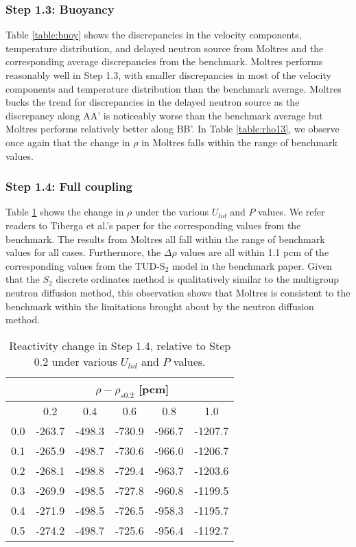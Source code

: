 \subsubsection{Step 1.3: Buoyancy}

Table \ref{table:buoy} shows the discrepancies in the velocity components,
temperature distribution, and delayed neutron source from Moltres and the
corresponding average discrepancies from the
benchmark. Moltres performs reasonably well in Step 1.3, with smaller
discrepancies in most of the velocity components and temperature distribution
than the benchmark average. Moltres bucks the trend for discrepancies
in the delayed neutron source as the discrepancy along AA' is
noticeably worse than the benchmark average but Moltres performs relatively
better along BB'. In Table \ref{table:rho13}, we observe once again that the
change in $\rho$ in Moltres falls within the range of benchmark values.

\subsubsection{Step 1.4: Full coupling}

Table \ref{table:full} shows the change in $\rho$ under the various $U_{lid}$
and $P$ values. We refer readers to Tiberga et al.'s paper
\cite{tiberga_results_2020} for the corresponding values from the benchmark.
The results from Moltres all fall within the range of benchmark values for all
cases. Furthermore, the $\Delta\rho$ values are all within 1.1 pcm of the
corresponding values from the TUD-S$_2$ model in the benchmark paper. Given
that the $S_2$ discrete ordinates method is qualitatively similar to the
multigroup neutron diffusion method, this observation shows that Moltres is
consistent to the benchmark within the limitations brought about by the neutron
diffusion method.

\begin{table}[htbp!]
	\caption{Reactivity change in Step 1.4, relative to Step 0.2 under various
	$U_{lid}$ and $P$ values.}
	\centering
	\small
	\setlength\tabcolsep{1.5pt}
	\begin{tabular}{c c c c c c}
		\toprule
		& \multicolumn{5}{c}{$\rho - \rho_{s0.2}$ [pcm]} \\
		\midrule
		{\backslashbox{$U_{lid}$ [m$\cdot$s$^{-1}$]}{$P$ [GW]}} & 0.2 & 0.4 & 0.6 & 0.8 & 1.0 \\
		\midrule
		0.0 & -263.7 & -498.3 & -730.9 & -966.7 & -1207.7 \\
		0.1 & -265.9 & -498.7 & -730.6 & -966.0 & -1206.7 \\
		0.2 & -268.1 & -498.8 & -729.4 & -963.7 & -1203.6 \\
		0.3 & -269.9 & -498.5 & -727.8 & -960.8 & -1199.5 \\
		0.4 & -271.9 & -498.5 & -726.5 & -958.3 & -1195.7 \\
		0.5 & -274.2 & -498.7 & -725.6 & -956.4 & -1192.7 \\
		\bottomrule
	\end{tabular}
	\label{table:full}
\end{table}
